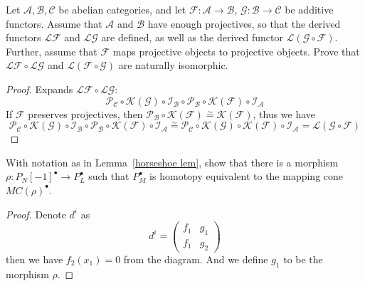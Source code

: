 \begin{exercise}
Let $\mathcal{A},\mathcal{B},\mathcal{C}$ be abelian categories, and let $\mathscr{F}:\mathcal{A}\to\mathcal{B}$, $\mathscr{G}:\mathcal{B}\to\mathcal{C}$ be additive functors. Assume that $\mathcal{A}$ and $\mathcal{B}$ have enough projectives, so that the derived functors $\mathcal{L}\mathscr{F}$ and $\mathcal{L}\mathscr{G}$ are defined, as well as the derived functor $\mathcal{L}(\mathscr{G}\circ\mathscr{F})$. Further, assume that $\mathscr{F}$ maps projective objects to projective objects. Prove that $\mathcal{L}\mathscr{F}\circ\mathcal{L}\mathscr{G}$ and $\mathcal{L}(\mathscr{F}\circ\mathscr{G})$ are naturally isomorphic.
\end{exercise}
\begin{proof}
Expands $\mathcal{L}\mathscr{F}\circ\mathcal{L}\mathscr{G}$:
\[\mathscr{P}_{\mathcal{C}}\circ\mathcal{K}(\mathscr{G})\circ\mathscr{I}_{\mathcal{B}}\circ\mathscr{P}_{\mathcal{B}}\circ\mathcal{K}(\mathscr{F})\circ\mathscr{I}_{\mathcal{A}}\]
If $\mathscr{F}$ preserves projectives, then $\mathscr{P}_{\mathcal{B}}\circ\mathcal{K}(\mathscr{F})\stackrel{\sim}{=}\mathcal{K}(\mathscr{F})$, thus we have
\[\mathscr{P}_{\mathcal{C}}\circ\mathcal{K}(\mathscr{G})\circ\mathscr{I}_{\mathcal{B}}\circ\mathscr{P}_{\mathcal{B}}\circ\mathcal{K}(\mathscr{F})\circ\mathscr{I}_{\mathcal{A}}\stackrel{\sim}{=}\mathscr{P}_{\mathcal{C}}\circ\mathcal{K}(\mathscr{G})\circ\mathcal{K}(\mathscr{F})\circ\mathscr{I}_{\mathcal{A}}=\mathcal{L}(\mathscr{G}\circ\mathscr{F})\]
\end{proof}
\begin{exercise}
With notation as in Lemma~\ref{horseshoe lem}, show that there is a morphism $\rho:P_N[-1]^\bullet\to P_L^\bullet$ such that $P_M^\bullet$ is homotopy equivalent to the mapping cone $MC(\rho)^\bullet$.
\end{exercise}
\begin{proof}
Denote $d^i$ as
\[d^i=\begin{pmatrix}
f_1&g_1\\
f_1&g_2
\end{pmatrix}\]
then we have $f_2(x_1)=0$ from the diagram. And we define $g_1$ to be the morphism $\rho$.
\end{proof}
